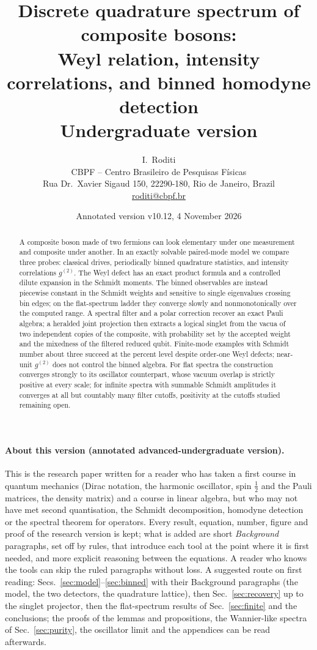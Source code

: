 \documentclass[11pt,a4paper]{article}
\title{Discrete quadrature spectrum of composite bosons:\\ Weyl relation, intensity correlations, and binned homodyne detection\\[6pt] \large Undergraduate version}
\author{I.~Roditi\\[4pt]
\small CBPF -- Centro Brasileiro de Pesquisas F\'isicas\\
\small Rua Dr.~Xavier Sigaud 150, 22290-180, Rio de Janeiro, Brazil\\
\small \href{mailto:roditi@cbpf.br}{roditi@cbpf.br}}
\date{Annotated version v10.12, 4 November 2026}
\begin{document}
\maketitle

\begin{abstract}
A composite boson made of two fermions can look elementary under one measurement and composite under another. In an exactly solvable paired-mode model we compare three probes: classical drives, periodically binned quadrature statistics, and intensity correlations $g^{(2)}$. The Weyl defect has an exact product formula and a controlled dilute expansion in the Schmidt moments. The binned observables are instead piecewise constant in the Schmidt weights and sensitive to single eigenvalues crossing bin edges; on the flat-spectrum ladder they converge slowly and nonmonotonically over the computed range. A spectral filter and a polar correction recover an exact Pauli algebra; a heralded joint projection then extracts a logical singlet from the vacua of two independent copies of the composite, with probability set by the accepted weight and the mixedness of the filtered reduced qubit. Finite-mode examples with Schmidt number about three succeed at the percent level despite order-one Weyl defects; near-unit $g^{(2)}$ does not control the binned algebra. For flat spectra the construction converges strongly to its oscillator counterpart, whose vacuum overlap is strictly positive at every scale; for infinite spectra with summable Schmidt amplitudes it converges at all but countably many filter cutoffs, positivity at the cutoffs studied remaining open.
\end{abstract}

\paragraph{About this version (annotated advanced-undergraduate version).}
This is the research paper written for a reader who has taken a first course in quantum mechanics (Dirac notation, the harmonic oscillator, spin $\tfrac12$ and the Pauli matrices, the density matrix) and a course in linear algebra, but who may not have met second quantisation, the Schmidt decomposition, homodyne detection or the spectral theorem for operators. Every result, equation, number, figure and proof of the research version is kept; what is added are short \emph{Background} paragraphs, set off by rules, that introduce each tool at the point where it is first needed, and more explicit reasoning between the equations. A reader who knows the tools can skip the ruled paragraphs without loss. A suggested route on first reading: Secs.~\ref{sec:model}--\ref{sec:binned} with their Background paragraphs (the model, the two detectors, the quadrature lattice), then Sec.~\ref{sec:recovery} up to the singlet projector, then the flat-spectrum results of Sec.~\ref{sec:finite} and the conclusions; the proofs of the lemmas and propositions, the Wannier-like spectra of Sec.~\ref{sec:purity}, the oscillator limit and the appendices can be read afterwards.
\end{document}

